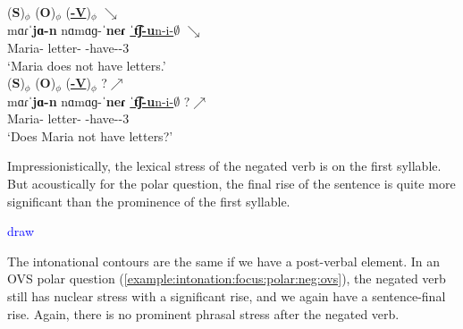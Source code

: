 \begin{exe}
	\ex \begin{xlist}
		\ex \glll   (\textbf{S})$_\phi$ (\textbf{O})$_\phi$ (\underline{\textbf{{\neggloss}-V}})$_\phi$ $\searrow$ \\
		mɑɾˈ\textbf{jɑ-n} {nɑmɑɡ-ˈ\textbf{neɾ}} \underline{ˈ\textbf{t͡ʃ-u}n-i-$\emptyset$}  $\searrow$ \\
		Maria-{} letter-{\pl} {\neggloss}-have-{\thgloss}-3{\sg}   \\
		\trans `Maria does not have letters.' 
		\label{example:intonation:focus:polar:neg:dec}
		\\ 
		\ex \glll   (\textbf{S})$_\phi$ (\textbf{O})$_\phi$ (\underline{\textbf{{\neggloss}-V}})$_\phi$ ?$\nearrow$ \\
		mɑɾˈ\textbf{jɑ-n} {nɑmɑɡ-ˈ\textbf{neɾ}} \underline{ˈ\textbf{t͡ʃ-u}n-i-$\emptyset$}  ?$\nearrow$ \\
		Maria-{} letter-{\pl} {\neggloss}-have-{\thgloss}-3{\sg}   \\
		\trans `Does Maria  not have letters?' 
		\label{example:intonation:focus:polar:neg:pol}
		\\ 
		
	\end{xlist}
\end{exe}



Impressionistically, the lexical stress of the negated verb is on the first syllable. But acoustically for the polar question, the final rise of the sentence is quite more significant than the prominence of the first syllable. 

\textcolor{blue}{draw}

The intonational contours are the same if we have a post-verbal element. In an OVS polar question (\ref{example:intonation:focus:polar:neg:ovs}), the negated verb still has nuclear stress with a significant rise, and we again have a sentence-final rise. Again, there is no prominent phrasal stress after the negated verb. 

